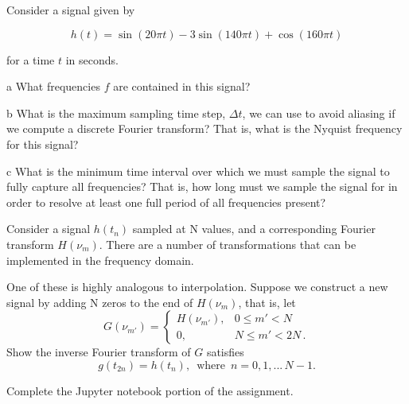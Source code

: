\documentclass[]{homework}
\begin{document}

\begin{problem}{1}
  Consider a signal given by

  \[
  h(t) = \sin(20\pi t) - 3 \sin(140\pi t) + \cos (160 \pi t)
  \]

  for a time $t$ in seconds.

  \begin{subproblem}{a}
    What frequencies $f$ are contained in this signal?
  \end{subproblem}

  \begin{subproblem}{b}
    What is the maximum sampling time step, $\Delta t$, we can use to avoid aliasing if we compute
    a discrete Fourier transform? That is, what is the Nyquist frequency for this signal?
  \end{subproblem}

  \begin{subproblem}{c}
    What is the minimum time interval over which we must sample the signal to fully capture
    all frequencies? That is, how long must we sample the signal for in order to resolve at
    least one full period of all frequencies present?
  \end{subproblem}

\end{problem}


\begin{problem}{2}
  Consider a signal $h(t_n)$ sampled at N values, and a corresponding Fourier transform $H(\nu_m)$.
  There are a number of transformations that can be implemented in the frequency domain.

  One of these is highly analogous to interpolation.
  Suppose we construct a new signal by adding N zeros to the end of $H(\nu_m)$, that is, let 
    \[
      G(\nu_{m'}) = \begin{cases} 
      H(\nu_{m'}), & 0 \le m' < N \\
      0, & N \le m' < 2N\,.
   \end{cases}
    \]
    Show the inverse Fourier transform of $G$ satisfies
    \[
      g(t_{2n}) = h(t_n), \mathrm{\,\,\, where \,\,\,} n = 0, 1, ...\, N-1.
    \]

\end{problem}


\begin{problem}{3}
  Complete the Jupyter notebook portion of the assignment.
\end{problem}
\end{document}
